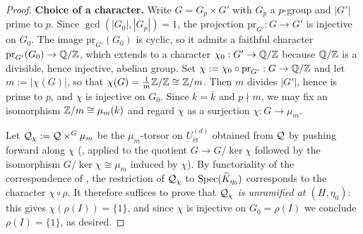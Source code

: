 \begin{proof}
    \textbf{Choice of a character.}
    Write $G = G_p \times G'$ with $G_p$ a $p$-group and $|G'|$ prime to $p$. Since
    $\gcd(|G_0|, |G_p|) = 1$, the projection $\mathrm{pr}_{G'} : G \to G'$ is injective on
    $G_0$. The image $\mathrm{pr}_{G'}(G_0)$ is cyclic, so it admits a faithful character
    $\mathrm{pr}_{G'}(G_0) \to \mathbb{Q}/\mathbb{Z}$, which extends to a character $\chi_0 : G' \to \mathbb{Q}/\mathbb{Z}$
    because $\mathbb{Q}/\mathbb{Z}$ is a divisible, hence injective, abelian group. Set
    $\chi := \chi_0 \circ \mathrm{pr}_{G'} : G \to \mathbb{Q}/\mathbb{Z}$ and let $m := |\chi(G)|$, so that
    $\chi(G) = \frac{1}{m}\mathbb{Z}/\mathbb{Z} \cong \mathbb{Z}/m$. Then $m$ divides $|G'|$, hence is prime to $p$,
    and $\chi$ is injective on $G_0$. Since $k = \bar{k}$ and $p \nmid m$, we may fix an
    isomorphism $\mathbb{Z}/m \cong \mu_m(k)$ and regard $\chi$ as a surjection $\chi : G \to \mu_m$.

    Let $\mathcal{Q}_\chi := \mathcal{Q} \times^{G} \mu_m$ be the $\mu_m$-torsor on $U^{(d)}_{\text{\'et}}$
    obtained from $\mathcal{Q}$ by pushing forward along $\chi$ (, applied
    to the quotient $G \to G/\ker\chi$ followed by the isomorphism
    $G/\ker\chi \cong \mu_m$ induced by $\chi$). By functoriality of the correspondence of
    , the restriction of $\mathcal{Q}_\chi$ to
    $\operatorname{Spec}(\widehat{K}_{\eta_0})$ corresponds to the character $\chi \circ \rho$. It therefore
    suffices to prove that \emph{$\mathcal{Q}_\chi$ is unramified at $(H, \eta_0)$}: this gives
    $\chi(\rho(I)) = \{1\}$, and since $\chi$ is injective on $G_0 = \rho(I)$ we conclude
    $\rho(I) = \{1\}$, as desired.


\end{proof}
